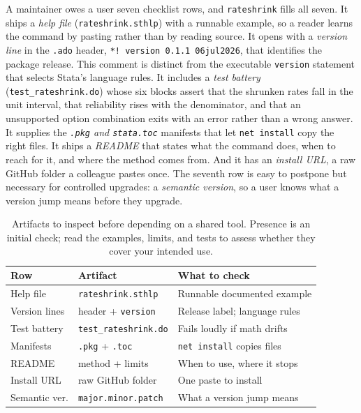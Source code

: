 A maintainer owes a user seven checklist rows, and \texttt{rateshrink} fills all seven. It ships a \emph{help file} (\texttt{rateshrink.sthlp}) with a runnable example, so a reader learns the command by pasting rather than by reading source. It opens with a \emph{version line} in the \texttt{.ado} header, \texttt{*! version 0.1.1  06jul2026}, that identifies the package release. This comment is distinct from the executable \texttt{version} statement that selects Stata's language rules. It includes a \emph{test battery} (\texttt{test\_rateshrink.do}) whose six blocks assert that the shrunken rates fall in the unit interval, that reliability rises with the denominator, and that an unsupported option combination exits with an error rather than a wrong answer. It supplies the \emph{\texttt{.pkg} and \texttt{stata.toc}} manifests that let \texttt{net install} copy the right files. It ships a \emph{README} that states what the command does, when to reach for it, and where the method comes from. And it has an \emph{install URL}, a raw GitHub folder a colleague pastes once. The seventh row is easy to postpone but necessary for controlled upgrades: a \emph{semantic version}, so a user knows what a version jump means before they upgrade.

\begin{table}[htbp]
\centering
\caption[The seven-row tool-hardening checklist]{Artifacts to inspect before depending on a shared tool. Presence is an initial check; read the examples, limits, and tests to assess whether they cover your intended use.}
\label{tab:ch15-viz-checklist}
\footnotesize
\begin{tabular}{lll}
\hline
Row & Artifact & What to check \\
\hline
Help file     & \texttt{rateshrink.sthlp}     & Runnable documented example \\
Version lines & header + \texttt{version} & Release label; language rules \\
Test battery  & \texttt{test\_rateshrink.do}  & Fails loudly if math drifts \\
Manifests     & \texttt{.pkg} + \texttt{.toc} & \texttt{net install} copies files \\
README        & method + limits              & When to use, where it stops \\
Install URL   & raw GitHub folder            & One paste to install \\
Semantic ver. & \texttt{major.minor.patch}    & What a version jump means \\
\hline
\end{tabular}
\end{table}

